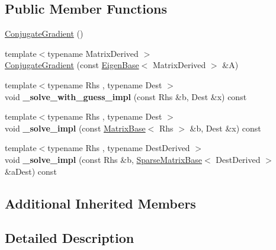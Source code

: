 \subsection*{Public Member Functions}
\begin{DoxyCompactItemize}
\item 
\mbox{\hyperlink{class_eigen_1_1_conjugate_gradient_a92a9656ca9fa4da240194f89229255eb}{Conjugate\+Gradient}} ()
\item 
{\footnotesize template$<$typename Matrix\+Derived $>$ }\\\mbox{\hyperlink{class_eigen_1_1_conjugate_gradient_ac10f778fcd137eca1f6057c8ddd3d644}{Conjugate\+Gradient}} (const \mbox{\hyperlink{struct_eigen_1_1_eigen_base}{Eigen\+Base}}$<$ Matrix\+Derived $>$ \&A)
\item 
\mbox{\label{class_eigen_1_1_conjugate_gradient_a06dadd6b4282026f340202d987ecd23f}} 
{\footnotesize template$<$typename Rhs , typename Dest $>$ }\\void {\bfseries \+\_\+solve\+\_\+with\+\_\+guess\+\_\+impl} (const Rhs \&b, Dest \&x) const
\item 
\mbox{\label{class_eigen_1_1_conjugate_gradient_a29cf39cbb200b90db87c83fea233478c}} 
{\footnotesize template$<$typename Rhs , typename Dest $>$ }\\void {\bfseries \+\_\+solve\+\_\+impl} (const \mbox{\hyperlink{class_eigen_1_1_matrix_base}{Matrix\+Base}}$<$ Rhs $>$ \&b, Dest \&x) const
\item 
\mbox{\label{class_eigen_1_1_conjugate_gradient_a7c2a35dde0ddb891b4030143ed286743}} 
{\footnotesize template$<$typename Rhs , typename Dest\+Derived $>$ }\\void {\bfseries \+\_\+solve\+\_\+impl} (const Rhs \&b, \mbox{\hyperlink{class_eigen_1_1_sparse_matrix_base}{Sparse\+Matrix\+Base}}$<$ Dest\+Derived $>$ \&a\+Dest) const
\end{DoxyCompactItemize}
\subsection*{Additional Inherited Members}


\subsection{Detailed Description}
